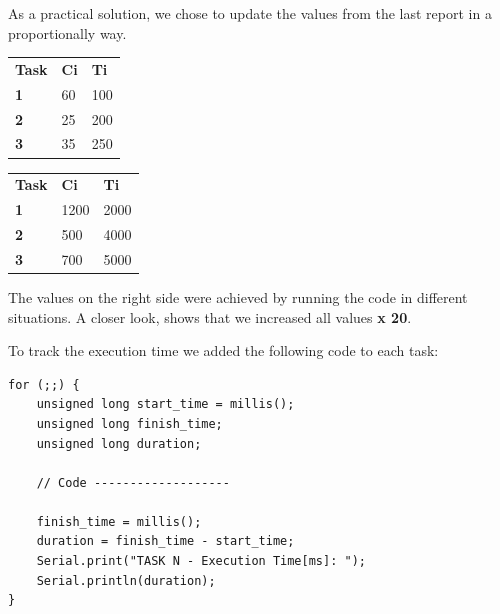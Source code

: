 \documentclass[11pt]{article}
\begin{document}
As a practical solution, we chose to update the values from the last report in a proportionally way.
 
\begin{table}[H]
    \caption{Theoretical values (left) and implemented values (right) in \textit{ms}:}
    \begin{minipage}{0.7\linewidth}
		\begin{table}[H]
		\begin{tabular}{lll}
		\textbf{Task} & \textbf{Ci} & \textbf{Ti} \\
		\textbf{1}    & 60         & 100           \\
		\textbf{2}    & 25         & 200           \\
		\textbf{3}    & 35         & 250          
		\end{tabular}
		\label{table:rt-1}
		\end{table}
    \end{minipage}%
    \begin{minipage}{.5\linewidth}
		\begin{table}[H]
		\begin{tabular}{lll}
		\textbf{Task} & \textbf{Ci} & \textbf{Ti} \\
		\textbf{1}    & 1200         & 2000           \\
		\textbf{2}    & 500         & 4000           \\
		\textbf{3}    & 700         & 5000          
		\end{tabular}
		\label{table:rt-2}
		\end{table}
    \end{minipage} 
\end{table}

The values on the right side were achieved by running the code in different situations. A closer look, shows that we increased all values \textbf{x 20}.

To track the execution time we added the following code to each task:

\begin{verbatim}
for (;;) {
    unsigned long start_time = millis();
    unsigned long finish_time;
    unsigned long duration;

    // Code -------------------

    finish_time = millis();      
    duration = finish_time - start_time;
    Serial.print("TASK N - Execution Time[ms]: ");
    Serial.println(duration); 
}
\end{verbatim}
\end{document}
